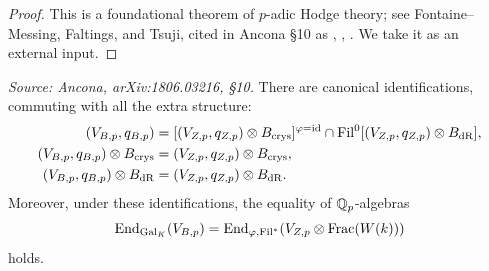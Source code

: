 \begin{proof}
  This is a foundational theorem of \(p\)-adic Hodge theory; see
  Fontaine--Messing, Faltings, and Tsuji, cited in Ancona \S10 as
  \cite{FontMess}, \cite{Falt}, \cite{CF}. We take it as an external input.
\end{proof}

\begin{corollary}
  \label{cor:crys-identifications}
  \textit{Source: Ancona, arXiv:1806.03216, \S10.}
  There are canonical identifications, commuting with all the extra structure:
  \begin{align}
    (V_{B,p}, q_{B,p}) &= [(V_{Z,p}, q_{Z,p}) \otimes B_{\mathrm{crys}}]^{\varphi=\mathrm{id}}
      \cap \mathrm{Fil}^0[(V_{Z,p}, q_{Z,p}) \otimes B_{\mathrm{dR}}], \\
    (V_{B,p}, q_{B,p}) \otimes B_{\mathrm{crys}} &= (V_{Z,p}, q_{Z,p}) \otimes B_{\mathrm{crys}}, \\
    (V_{B,p}, q_{B,p}) \otimes B_{\mathrm{dR}} &= (V_{Z,p}, q_{Z,p}) \otimes B_{\mathrm{dR}}.
  \end{align}
  Moreover, under these identifications, the equality of \(\mathbb{Q}_p\)-algebras
  \[\mathrm{End}_{\mathrm{Gal}_K}(V_{B,p}) = \mathrm{End}_{\varphi,\mathrm{Fil}^*}(V_{Z,p} \otimes \mathrm{Frac}(W(k)))\]
  holds.
\end{corollary}

